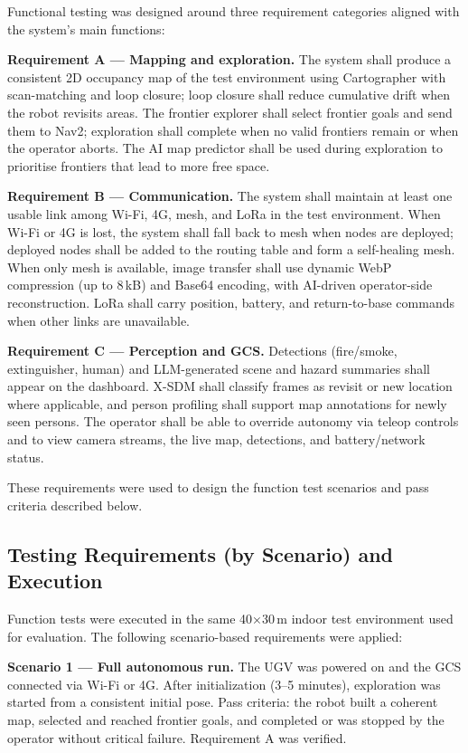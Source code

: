 Functional testing was designed around three requirement categories aligned with the system's main functions:

\textbf{Requirement A --- Mapping and exploration.} The system shall produce a consistent 2D occupancy map of the test environment using Cartographer with scan-matching and loop closure; loop closure shall reduce cumulative drift when the robot revisits areas. The frontier explorer shall select frontier goals and send them to Nav2; exploration shall complete when no valid frontiers remain or when the operator aborts. The AI map predictor shall be used during exploration to prioritise frontiers that lead to more free space.

\textbf{Requirement B --- Communication.} The system shall maintain at least one usable link among Wi-Fi, 4G, mesh, and LoRa in the test environment. When Wi-Fi or 4G is lost, the system shall fall back to mesh when nodes are deployed; deployed nodes shall be added to the routing table and form a self-healing mesh. When only mesh is available, image transfer shall use dynamic WebP compression (up to 8\,kB) and Base64 encoding, with AI-driven operator-side reconstruction. LoRa shall carry position, battery, and return-to-base commands when other links are unavailable.

\textbf{Requirement C --- Perception and GCS.} Detections (fire/smoke, extinguisher, human) and LLM-generated scene and hazard summaries shall appear on the dashboard. X-SDM shall classify frames as revisit or new location where applicable, and person profiling shall support map annotations for newly seen persons. The operator shall be able to override autonomy via teleop controls and to view camera streams, the live map, detections, and battery/network status.

These requirements were used to design the function test scenarios and pass criteria described below.

\subsection{Testing Requirements (by Scenario) and Execution}

Function tests were executed in the same 40×30\,m indoor test environment used for evaluation. The following scenario-based requirements were applied:

\textbf{Scenario 1 --- Full autonomous run.} The UGV was powered on and the GCS connected via Wi-Fi or 4G. After initialization (3--5 minutes), exploration was started from a consistent initial pose. Pass criteria: the robot built a coherent map, selected and reached frontier goals, and completed or was stopped by the operator without critical failure. Requirement A was verified.

